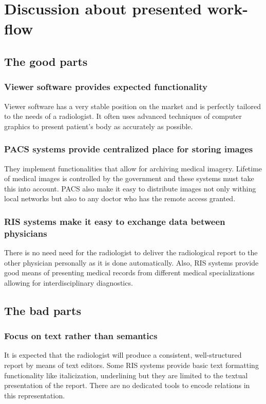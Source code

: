 \documentclass[12pt, twoside, openany]{report}
\theoremstyle{definition}
\begin{document}
\section{Discussion about presented work-flow}
\subsection{The good parts}
\subsubsection{Viewer software provides expected functionality}
Viewer software has a very stable position on the market and is perfectly tailored to the needs of a radiologist. It often uses advanced techniques of computer graphics to present patient's body as accurately as possible.
\subsubsection{PACS systems provide centralized place for storing images}
They implement functionalities that allow for archiving medical imagery. Lifetime of medical images is controlled by the government and these systems must take this into account. PACS also make it easy to distribute images not only withing local networks but also to any doctor who has the remote access granted.
\subsubsection{RIS systems make it easy to exchange data between physicians}
There is no need need for the radiologist to deliver the radiological report to the other physician personally as it is done automatically. Also, RIS systems provide good means of presenting medical records from different medical specializations allowing for interdisciplinary diagnostics. 
\subsection{The bad parts}
\subsubsection{Focus on text rather than semantics}
It is expected that the radiologist will produce a consistent, well-structured report by means of text editors. Some RIS systems provide basic text formatting functionality like italicization, underlining but they are limited to the textual presentation of the report. There are no dedicated tools to encode relations in this representation.
\end{document}
